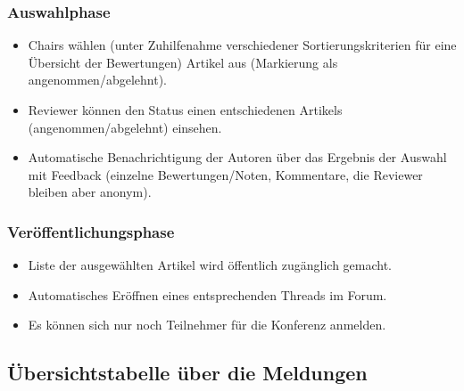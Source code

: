 \documentclass[headexclude,footexclude,12pt,BCOR0pt,DIV15]{scrartcl}
\begin{document}
        \subsubsection{Auswahlphase}
        \begin{itemize}
            \item Chairs w\"{a}hlen (unter Zuhilfenahme verschiedener Sortierungskriterien f\"{u}r eine \"{U}bersicht der
                  Bewertungen) Artikel aus (Markierung als angenommen/abgelehnt).
            \item Reviewer k\"{o}nnen den Status einen entschiedenen Artikels (angenommen/abgelehnt)
                  einsehen.
            \item Automatische Benachrichtigung der Autoren \"{u}ber das Ergebnis der Auswahl mit Feedback (einzelne
                  Bewertungen/Noten, Kommentare, die Reviewer bleiben aber anonym).
        \end{itemize}

        \subsubsection{Ver\"{o}ffentlichungsphase}
        \begin{itemize}
            \item Liste der ausgew\"{a}hlten Artikel wird \"{o}ffentlich zug\"{a}nglich gemacht.
            \item Automatisches Er\"{o}ffnen eines entsprechenden Threads im Forum.
            \item Es k\"{o}nnen sich nur noch Teilnehmer f\"{u}r die Konferenz anmelden.
        \end{itemize}

    \subsection{\"{U}bersichtstabelle \"{u}ber die Meldungen}
\end{document}
